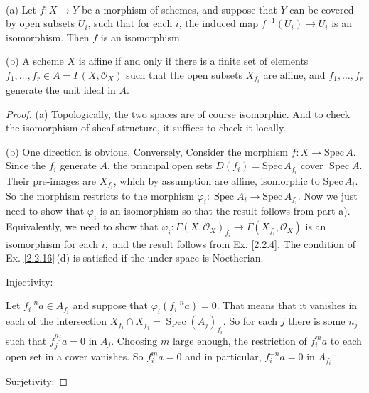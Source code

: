 \begin{exe}
	\label{2.2.17}
	\ 
	
	(a) Let $f: X \rightarrow Y$ be a morphism of schemes, and suppose that $Y$ can be covered by open subsets $U_{i}$, such that for each $i$, the induced map $f^{-1}\left(U_{i}\right) \rightarrow U_{i}$ is an isomorphism. Then $f$ is an isomorphism.
	
	(b) A scheme $X$ is affine if and only if there is a finite set of elements $f_{1}, \ldots, f_{r} \in A=\Gamma\left(X, \mathcal{O}_{X}\right)$ such that the open subsets $X_{f_{i}}$ are affine, and $f_{1}, \ldots, f_{r}$ generate the unit ideal in $A$.
\end{exe}
\begin{proof}
	(a) Topologically, the two spaces are of course isomorphic. And to check the isomorphism of sheaf structure, it suffices to check it locally.
	
	(b) One direction is obvious. Conversely,  Consider the morphism $f: X \rightarrow \mathrm{Spec}\, A$.  Since the $f_{i}$ generate $A$, the principal open sets $D\left(f_{i}\right)=\mathrm{Spec}\, A_{f_{i}}$ cover $\operatorname{Spec} A$. Their pre-images are $X_{f_{i}}$, which by assumption are affine, isomorphic to $\mathrm{Spec}\, A_{i}$. So the morphism restricts to the morphism $\varphi_{i}: \operatorname{Spec} A_{i} \rightarrow \mathrm{Spec}\, A_{f_{i}}$. Now we just need to show that $\varphi_{i}$ is an isomorphism so that the result follows from part a). Equivalently, we need to show that $\varphi_{i}: \Gamma\left(X, \mathcal{O}_{X}\right)_{f_{i}} \rightarrow \Gamma\left(X_{f_{i}}, \mathcal{O}_{X}\right)$
	is an isomorphism for each $i,$  and the result follows from Ex. \ref{2.2.4}.  The condition of Ex. \ref{2.2.16}\,(d) is satisfied if the under space is Noetherian.  
	
	Injectivity:
	
	Let $f_{i}^{-n}a \in A_{f_{i}}$ and suppose that $\varphi_{i}\left(f_{i}^{-n}a\right)=0$. That means that it vanishes in each of the intersection $X_{f_{i}} \cap X_{f_{j}}=\operatorname{Spec}\left(A_{j}\right)_{f_{i}}$.  So for each $j$ there is some $n_{j}$ such that $f_{j}^{n_{j}}a=0$ in $A_{j} .$ Choosing $m$ large enough, the restriction of $f_{i}^{m} a$ to each open set in a cover vanishes. So $f_{i}^{m} a=0$ and in particular, $f_{i}^{-n}a=0$ in $A_{f_{i}}$.
	
	Surjetivity:
	

\end{proof}
